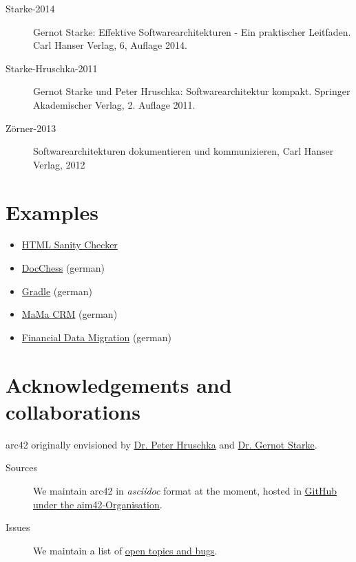 \documentclass[]{article}
\begin{document}
\begin{description}
\item[Starke-2014]
Gernot Starke: Effektive Softwarearchitekturen - Ein praktischer
Leitfaden. Carl Hanser Verlag, 6, Auflage 2014.
\item[Starke-Hruschka-2011]
Gernot Starke und Peter Hruschka: Softwarearchitektur kompakt. Springer
Akademischer Verlag, 2. Auflage 2011.
\item[Zörner-2013]
Softwarearchitekturen dokumentieren und kommunizieren, Carl Hanser
Verlag, 2012
\end{description}

\section{Examples}

\begin{itemize}
\item
  \href{http://aim42.github.io/htmlSanityCheck/hsc_arc42.html}{HTML
  Sanity Checker}
\item
  \href{http://www.dokchess.de/dokchess/arc42/}{DocChess} (german)
\item
  \href{http://www.embarc.de/arc42-starschnitt-gradle/}{Gradle} (german)
\item
  \href{http://confluence.arc42.org/display/arc42beispielmamacrm}{MaMa
  CRM} (german)
\item
  \href{http://confluence.arc42.org/display/migrationEg/Financial+Data+Migration}{Financial
  Data Migration} (german)
\end{itemize}

\section{Acknowledgements and collaborations}

arc42 originally envisioned by \href{http://b-agile.de}{Dr. Peter
Hruschka} and \href{http://gernotstarke.de}{Dr. Gernot Starke}.

\begin{description}
\item[Sources]
We maintain arc42 in \emph{asciidoc} format at the moment, hosted in
\href{https://github.com/aim42/aim42}{GitHub under the
aim42-Organisation}.
\item[Issues]
We maintain a list of
\href{https://github.com/arc42/arc42-template/issues}{open topics and
bugs}.
\end{description}
\end{document}
